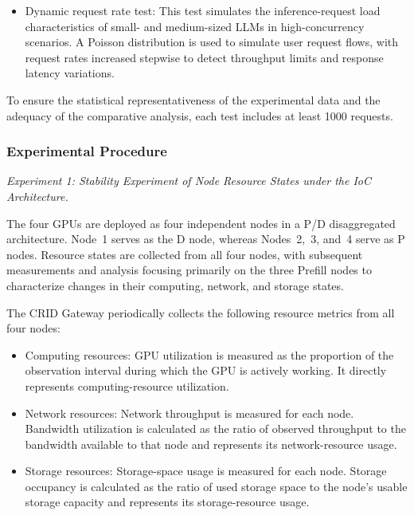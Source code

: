 \documentclass{ccjnl}
\begin{document}
\begin{itemize}[nosep]
\begin{itemize}[nosep]
	\item Dynamic request rate test: This test simulates the inference-request load characteristics of small- and medium-sized LLMs in high-concurrency scenarios. A Poisson distribution is used to simulate user request flows, with request rates increased stepwise to detect throughput limits and response latency variations.
\end{itemize}

\end{itemize}
To ensure the statistical representativeness of the experimental data and the adequacy of the comparative analysis, each test includes at least 1000 requests.

\subsubsection{Experimental Procedure}
\label{s6-2-2}

\par
{}
\noindent\textit{Experiment 1: Stability Experiment of Node Resource States under the IoC Architecture.}\par

The four GPUs are deployed as four independent nodes in a P/D disaggregated architecture. Node~1 serves as the D node, whereas Nodes~2,~3, and~4 serve as P nodes. Resource states are collected from all four nodes, with subsequent measurements and analysis focusing primarily on the three Prefill nodes to characterize changes in their computing, network, and storage states.

The CRID Gateway periodically collects the following resource metrics from all four nodes:
\begin{itemize}[nosep]
	\item Computing resources: GPU utilization is measured as the proportion of the observation interval during which the GPU is actively working. It directly represents computing-resource utilization.
	
	\item Network resources: Network throughput is measured for each node. Bandwidth utilization is calculated as the ratio of observed throughput to the bandwidth available to that node and represents its network-resource usage.
	
	\item Storage resources: Storage-space usage is measured for each node. Storage occupancy is calculated as the ratio of used storage space to the node's usable storage capacity and represents its storage-resource usage.
\end{itemize}
\end{document}
